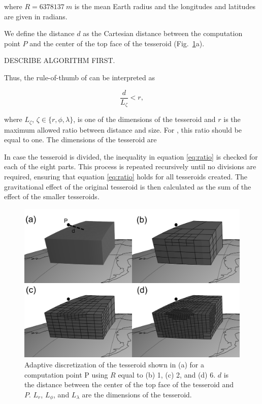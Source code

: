 \noindent
where $R=6378137\ m$ is the mean Earth radius
and the longitudes and latitudes are given in radians.

We define the distance $d$ as
the Cartesian distance between
the computation point $P$
and the center of the top face of the tesseroid
(Fig.~\ref{fig:ratio}a).

DESCRIBE ALGORITHM FIRST.

Thus, the rule-of-thumb of \citet{Ku1977}
can be interpreted as

\begin{equation}
    \frac{d}{L_\zeta} < r,
    \label{eq:ratio}
\end{equation}

\noindent
where
$L_\zeta$, $\zeta \in \{r, \phi, \lambda\}$,
is one of the dimensions of the tesseroid
and
$r$ is the maximum allowed ratio between distance and size.
For \citet{Ku1977}, this ratio should be equal to one.
The dimensions of the tesseroid are


In case the tesseroid is divided,
the inequality in equation \ref{eq:ratio}
is checked for each of the eight parts.
This process is repeated recursively
until no divisions are required,
ensuring that equation \ref{eq:ratio}
holds for all tesseroids created.
The gravitational effect
of the original tesseroid
is then calculated as
the sum of the effect
of the smaller tesseroids.

\begin{figure}
    \centering
    \includegraphics{figs/tesseroid-split}
    \caption{
        Adaptive discretization
        of the tesseroid shown in (a)
        for a computation point P
        using $R$ equal to
        (b) 1, (c) 2, and (d) 6.
        $d$ is the distance between
        the center of the top face of the tesseroid
        and $P$.
        $L_r$, $L_\phi$, and $L_\lambda$ are the dimensions of the tesseroid.
    }
    \label{fig:ratio}
\end{figure}

